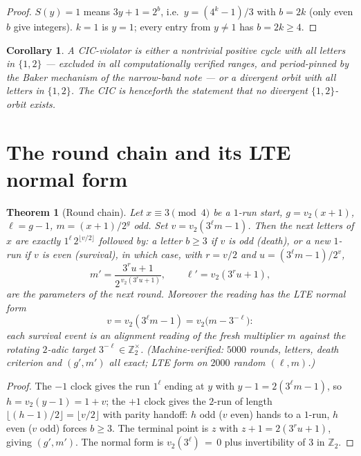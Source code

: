 \documentclass[11pt]{article}
\newtheorem{theorem}{Theorem}
\newtheorem{corollary}{Corollary}
\newcommand{\vt}{v_2}
\begin{document}
\begin{proof}
$S(y)=1$ means $3y+1=2^b$, i.e.\ $y=(4^k-1)/3$ with $b=2k$ (only even
$b$ give integers). $k=1$ is $y=1$; every entry from $y\ne1$ has
$b=2k\ge4$.
\end{proof}

\begin{corollary}\label{cor:red}
A CIC-violator is either a nontrivial positive cycle with all letters
in $\{1,2\}$ --- excluded in all computationally verified ranges, and
period-pinned by the Baker mechanism of the narrow-band note --- or a
\emph{divergent} orbit with all letters in $\{1,2\}$. The CIC is
henceforth the statement that no divergent $\{1,2\}$-orbit exists.
\end{corollary}

\section{The round chain and its LTE normal form}

\begin{theorem}[Round chain]\label{thm:chain}
Let $x\equiv3\pmod4$ be a $1$-run start, $g=\vt(x+1)$, $\ell=g-1$,
$m=(x+1)/2^g$ odd. Set $v=\vt(3^\ell m-1)$. Then the next letters of
$x$ are exactly $1^\ell\,2^{\lfloor v/2\rfloor}$ followed by: a letter
$b\ge3$ if $v$ is odd (\emph{death}), or a new $1$-run if $v$ is even
(\emph{survival}), in which case, with $r=v/2$ and
$u=(3^\ell m-1)/2^v$,
\[
m'=\frac{3^ru+1}{2^{\,\vt(3^ru+1)}},\qquad
\ell'=\vt(3^ru+1),
\]
are the parameters of the next round. Moreover the reading has the
LTE normal form
\[
v=\vt(3^\ell m-1)=\vt\bigl(m-3^{-\ell}\bigr):
\]
each survival event is an alignment reading of the fresh multiplier
$m$ against the rotating $2$-adic target $3^{-\ell}\in\mathbb Z_2^\times$.
(Machine-verified: $5000$ rounds, letters, death criterion and
$(g',m')$ all exact; LTE form on $2000$ random $(\ell,m)$.)
\end{theorem}

\begin{proof}
The $-1$ clock gives the run $1^\ell$ ending at $y$ with
$y-1=2(3^\ell m-1)$, so $h=\vt(y-1)=1+v$; the $+1$ clock gives the
$2$-run of length $\lfloor(h-1)/2\rfloor=\lfloor v/2\rfloor$ with
parity handoff: $h$ odd ($v$ even) hands to a $1$-run, $h$ even ($v$
odd) forces $b\ge3$. The terminal point is $z$ with
$z+1=2(3^ru+1)$, giving $(g',m')$. The normal form is
$\vt(3^\ell)\,{=}\,0$ plus invertibility of $3$ in $\mathbb Z_2$.
\end{proof}
\end{document}
